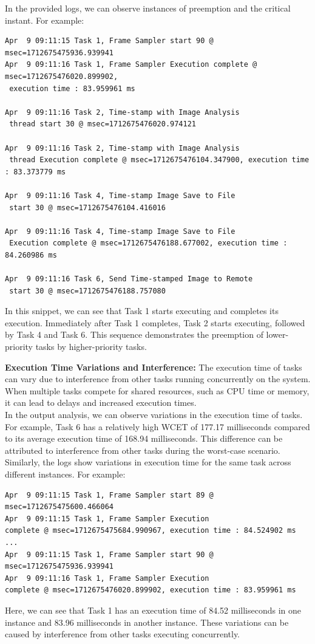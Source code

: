 \documentclass[a4paper,11pt]{article}%
\newenvironment{qanda}{\setlength{\parindent}{0pt}}{\bigskip}
\begin{document}
\begin{qanda}
\begin{enumerate}
			In the provided logs, we can observe instances of preemption and the critical instant. For example:

			\begin{lstlisting}
Apr  9 09:11:15 Task 1, Frame Sampler start 90 @ msec=1712675475936.939941
Apr  9 09:11:16 Task 1, Frame Sampler Execution complete @ msec=1712675476020.899902,
 execution time : 83.959961 ms

Apr  9 09:11:16 Task 2, Time-stamp with Image Analysis
 thread start 30 @ msec=1712675476020.974121

Apr  9 09:11:16 Task 2, Time-stamp with Image Analysis
 thread Execution complete @ msec=1712675476104.347900, execution time : 83.373779 ms

Apr  9 09:11:16 Task 4, Time-stamp Image Save to File
 start 30 @ msec=1712675476104.416016

Apr  9 09:11:16 Task 4, Time-stamp Image Save to File
 Execution complete @ msec=1712675476188.677002, execution time : 84.260986 ms

Apr  9 09:11:16 Task 6, Send Time-stamped Image to Remote
 start 30 @ msec=1712675476188.757080
\end{lstlisting}

			In this snippet, we can see that Task 1 starts executing and completes its execution. Immediately after Task 1 completes, Task 2 starts executing, followed by Task 4 and Task 6. This sequence demonstrates the preemption of lower-priority tasks by higher-priority tasks.

			\textbf{Execution Time Variations and Interference:}
			The execution time of tasks can vary due to interference from other tasks running concurrently on the system. When multiple tasks compete for shared resources, such as CPU time or memory, it can lead to delays and increased execution times.\\

			In the output analysis, we can observe variations in the execution time of tasks. For example, Task 6 has a relatively high WCET of 177.17 milliseconds compared to its average execution time of 168.94 milliseconds. This difference can be attributed to interference from other tasks during the worst-case scenario.\\

			Similarly, the logs show variations in execution time for the same task across different instances. For example:

			\begin{lstlisting}
Apr  9 09:11:15 Task 1, Frame Sampler start 89 @ msec=1712675475600.466064
Apr  9 09:11:15 Task 1, Frame Sampler Execution 
complete @ msec=1712675475684.990967, execution time : 84.524902 ms
...
Apr  9 09:11:15 Task 1, Frame Sampler start 90 @ msec=1712675475936.939941
Apr  9 09:11:16 Task 1, Frame Sampler Execution 
complete @ msec=1712675476020.899902, execution time : 83.959961 ms
\end{lstlisting}
			Here, we can see that Task 1 has an execution time of 84.52 milliseconds in one instance and 83.96 milliseconds in another instance. These variations can be caused by interference from other tasks executing concurrently.


\end{enumerate}
\end{qanda}
\end{document}
